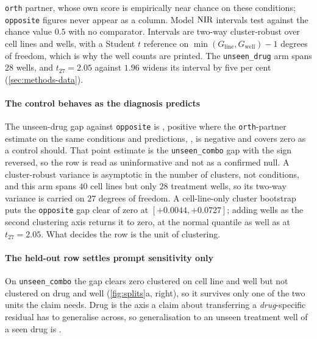 \begin{table}[htbp]
\begin{fullwidth}
\begin{threeparttable}
\begin{tablenotes}[flushleft]
\texttt{orth} partner, whose own score is empirically near chance on these
conditions; \texttt{opposite} figures never appear as a column. Model $\textrm{NIR}$
intervals test against the chance value $0.5$ with no comparator. Intervals are
two-way cluster-robust over cell lines and wells, with a Student $t$ reference
on $\min(G_{\textrm{line}}, G_{\textrm{well}}) - 1$ degrees of freedom, which is
why the well counts are printed. The \texttt{unseen\_drug} arm spans $28$
wells, and $t_{27} = 2.05$ against $1.96$ widens its interval by five per cent
(\cref{sec:methods-data}).
\end{tablenotes}
\end{threeparttable}
\end{fullwidth}
\end{table}

\paragraph{The control behaves as the diagnosis predicts} The unseen-drug gap
against \texttt{opposite} is , positive where the
\texttt{orth}-partner estimate on the same conditions and predictions,
, is negative and covers zero as a control should.
That point estimate is the \texttt{unseen\_combo} gap with the sign reversed, so
the row is read as uninformative and not as a confirmed null. A cluster-robust
variance is asymptotic in the number of clusters, not conditions, and this arm
spans $40$ cell lines but only $28$ treatment wells, so its two-way variance is
carried on $27$ degrees of freedom. A cell-line-only cluster bootstrap puts the
\texttt{opposite} gap clear of zero at $[+0.0044, +0.0727]$; adding wells as the
second clustering axis returns it to zero, at the normal quantile as well as at
$t_{27} = 2.05$. What decides the row is the unit of clustering.

\paragraph{The held-out row settles prompt sensitivity only} On
\texttt{unseen\_combo} the gap clears zero clustered on cell line and well but
not clustered on drug and
well (\cref{fig:splits}a, right), so it survives only one of the two units the
claim needs. Drug is the axis
a claim about transferring a \emph{drug}-specific residual has to generalise
across, so
generalisation to an unseen treatment well of a seen drug is \notestablished.

